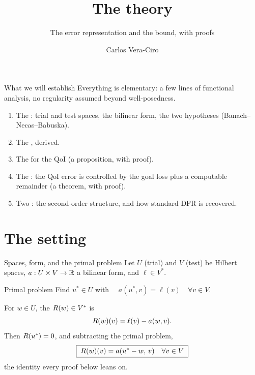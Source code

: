 \documentclass[11pt,aspectratio=169]{beamer}
\title{The theory}
\subtitle{The error representation and the bound, with proofs}
\author{Carlos Vera-Ciro}
\institute{Goal-Oriented DFR series \textbar\ Part 3}
\date{}
\begin{document}
\begin{frame}
  \titlepage
\end{frame}

\begin{frame}{What we will establish}
  Everything is elementary: a few lines of functional analysis, no
  regularity assumed beyond well-posedness.
  \medskip
  \begin{enumerate}\itemsep0.5em
    \item The : trial and test spaces, the bilinear form, the
          two hypotheses (Banach--Necas--Babuska).
    \item The , derived.
    \item The  for the QoI (a proposition,
          with proof).
    \item The : the QoI error is controlled by the goal
          loss plus a computable remainder (a theorem, with proof).
    \item Two : the second-order structure, and how standard
          DFR is recovered.
  \end{enumerate}
\end{frame}

\section{The setting}

\begin{frame}{Spaces, form, and the primal problem}
  Let $U$ (trial) and $V$ (test) be Hilbert spaces, $a : U \times V \to \mathbb{R}$ a
  bilinear form, and $\ell \in V^*$.
  \medskip
  \begin{block}{Primal problem}
    Find $u^* \in U$ with $\quad a(u^*, v) = \ell(v) \quad \forall v \in V.$
  \end{block}
  \medskip
  For $w \in U$, the  $R(w) \in V^*$ is
  \[
    R(w)(v) = \ell(v) - a(w, v).
  \]
  Then $R(u^*) = 0$, and subtracting the primal problem,
  \[
    \boxed{\;R(w)(v) = a(u^* - w,\, v) \quad \forall v \in V\;}
  \]
  the identity every proof below leans on.
\end{frame}
\end{document}
